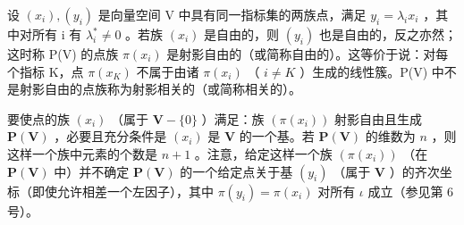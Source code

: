 设 \((x_{i}), (y_{i})\) 是向量空间 V 中具有同一指标集的两族点，满足 \(y_{i} = \lambda_{i}x_{i}\) ，其中对所有 i 有 \(\lambda_{i}^{*} \neq 0\) 。若族 \((x_{i})\) 是自由的，则 \((y_{i})\) 也是自由的，反之亦然；这时称 P(V) 的点族 \(\pi(x_{i})\) 是射影自由的（或简称自由的）。这等价于说：对每个指标 K，点 \(\pi(x_{K})\) 不属于由诸 \(\pi(x_{i})\) （ \(i \neq K\) ）生成的线性簇。P(V) 中不是射影自由的点族称为射影相关的（或简称相关的）。

要使点的族 \((x_{i})\) （属于 \(\mathbf{V} - \{0\}\) ）满足：族 \((\pi (x_{i}))\) 射影自由且生成 \(\mathbf{P}(\mathbf{V})\) ，必要且充分条件是 \((x_{i})\) 是 \(\mathbf{V}\) 的一个基。若 \(\mathbf{P}(\mathbf{V})\) 的维数为 \(n\) ，则这样一个族中元素的个数是 \(n + 1\) 。注意，给定这样一个族 \((\pi (x_{i}))\) （在 \(\mathbf{P}(\mathbf{V})\) 中）并不确定 \(\mathbf{P}(\mathbf{V})\) 的一个给定点关于基 \((y_{i})\) （属于 \(\mathbf{V}\) ）的齐次坐标（即使允许相差一个左因子），其中 \(\pi (y_{i}) = \pi (x_{i})\) 对所有 \(\iota\) 成立（参见第 6 号）。

